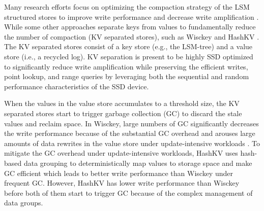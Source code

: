 \documentclass[sigconf]{acmart}
\begin{document}
Many research efforts focus on optimizing the compaction strategy of the LSM structured stores to improve write performance \cite{HyperLevelDB,bLSM,PCP,cLSM,CM} and decrease write amplification \cite{LSMtrie,skiptree,LWCtree,TRIAD}. While some other approaches separate keys from values to fundamentally reduce the number of compaction (KV separated stores), such as Wisckey \cite{Wisckey} and HashKV \cite{HashKV}. The KV separated stores consist of a key store (e.g., the LSM-tree) and a value store (i.e., a recycled log). KV separation is present to be highly SSD optimized to significantly reduce write amplification while preserving the efficient writes, point lookup, and range queries by leveraging both the sequential and random performance characteristics of the SSD device.


When the values in the value store accumulates to a threshold size, the KV separated stores start to trigger garbage collection (GC) to discard the stale values and reclaim space. In Wisckey, large numbers of GC significantly decreases the write performance because of the substantial GC overhead \cite{Wisckey} and arouses large amounts of data rewrites in the value store under update-intensive workloads \cite{HashKV}. To mitigate the GC overhead under update-intensive workloads, HashKV uses hash-based data grouping to deterministically map values to storage space and make GC efficient which leads to better write performance than Wisckey under frequent GC. However, HashKV has lower write performance than Wisckey before both of them start to trigger GC because of the complex management of data groups.
\end{document}
